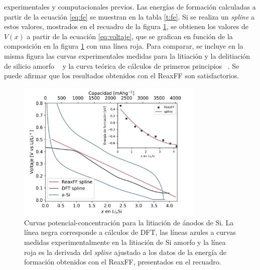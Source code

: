 experimentales y computacionales previos. Las energías de formación calculadas
a partir de la ecuación \ref{eq:fe} se muestran en la tabla \ref{t:fe}. 
Si se realiza un \textit{spline} a estos valores, mostrados en el recuadro de la
figura \ref{fig:voltaje}, se obtienen los valores de $V(x)$ a partir de la ecuación
\ref{eq:voltaje}, que se grafican en función de la composición en la figura 
\ref{fig:voltaje} con una línea roja. Para comparar, se incluye en la misma figura
las curvas experimentales medidas para la litiación y la delitiación de silicio
amorfo ~\cite{hatchard2004} y la curva teórica de cálculos de primeros principios 
~\cite{chevrier2009}. Se puede afirmar que los resultados obtenidos con el ReaxFF 
son satisfactorios.
\begin{figure}[th]
    \centering
    \includegraphics[width=0.8\textwidth]{Silicio/caracterizacion/resultados/electroquimica/voltaje.png}
    \caption{Curvas potencial-concentración para la litiación de ánodos de Si.
    La línea negra corresponde a cálculos de DFT, las líneas azules a 
    curvas medidas experimentalmente en la litiación de Si amorfo y la línea 
    roja es la derivada del \textit{spline} ajustado a los datos de la energía 
    de formación obtenidos con el ReaxFF, presentados en el recuadro.}
    \label{fig:voltaje}
\end{figure}
